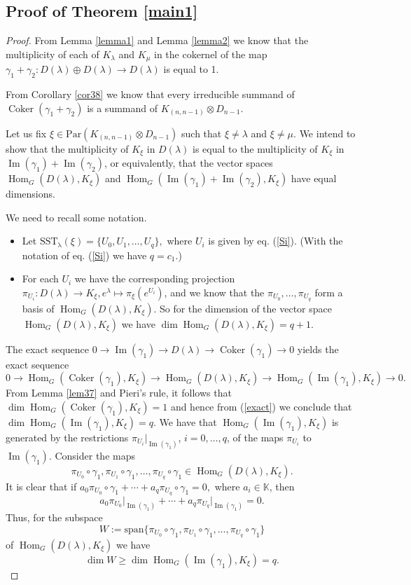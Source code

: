 \documentclass[11pt]{amsart}
\theoremstyle{definition}
\numberwithin{equation}{section}
\DeclareMathOperator{\Ima}{Im}
\DeclareMathOperator{\Hom}{Hom}
\DeclareMathOperator{\coker}{Coker}
\begin{document}
\subsection{ Proof of Theorem \ref{main1}}\label{proofmain}	
\begin{proof}	 From Lemma \ref{lemma1} and Lemma \ref{lemma2} we know that the multiplicity of each of $K_{\lambda}$ and $K_{\mu}$ in the cokernel of the map $\gamma_1 +\gamma_2 : D(\lambda) \oplus D(\lambda) \to D(\lambda)$ is equal to 1. 
	
From Corollary \ref{cor38} we know that every irreducible summand of $\coker(\gamma_1+\gamma_2)$ is a summand of $K_{(n,n-1)} \otimes  D_{n-1}$.

 Let us fix $\xi \in \mathrm{Par}(K_{(n,n-1)} \otimes  D_{n-1})$ such that $\xi \neq \lambda$ and $\xi \neq \mu.$ We intend to show that the multiplicity of $K_\xi$ in $D(\lambda)$ is equal to the multiplicity of  $K_\xi$ in $\Ima(\gamma_1)+\Ima(\gamma_2)$, or equivalently, that the vector spaces $\Hom_G(D(\lambda), K_\xi ) $ and $\Hom_G(\Ima(\gamma_1)+\Ima(\gamma_2), K_\xi ) $ have equal dimensions.
	
	We need to recall some notation. \begin{itemize} \item Let 
	$\mathrm{SST_\lambda}(\xi) = \{ U_0,  U_1, \dots, U_q\},$
	where $U_i$ is given by eq. (\ref{Si}). (With the notation of eq. (\ref{Si}) we have $q=c_1$.) \item For each $U_i$ we have the corresponding projection $\pi_{U_i} : D(\lambda) \to K_\xi, e^\lambda \mapsto \pi_\xi(e^{U_i})$, and we know that the $\pi_{U_0}, \dots, \pi_{U_q}$ form a basis of 
	$\Hom_G(D(\lambda), K_{\xi})$. So for the dimension of the vector space $\Hom_G(D(\lambda), K_{\xi})$ we have $\dim \Hom_G(D(\lambda), K_{\xi}) = q+1$. \end{itemize}
	
	
	The exact sequence $0 \to \Ima(\gamma_1) \to D(\lambda) \to  \coker(\gamma_1) \to 0$ yields the exact sequence \begin{equation}\label{exact}
		0 \to \Hom_G(\coker(\gamma_1), K_\xi) \to \Hom_G(D(\lambda), K_{\xi}) \to \Hom_G(\Ima(\gamma_1), K_\xi)  \to 0.
	\end{equation}
	From Lemma \ref{lem37} and Pieri's rule, it follows that $\dim\Hom_G(\coker(\gamma_1), K_\xi) =1$ and hence from (\ref{exact}) we conclude that $\dim\Hom_G(\Ima(\gamma_1), K_\xi) =q$. We have that $\Hom_G(\Ima(\gamma_1), K_\xi)$ is generated by the restrictions $\pi_{U_i}\big|_{\Ima{(\gamma_1)}}$, $i=0, \dots, q$, of the maps $\pi_{U_i}$ to $\Ima(\gamma_1).$ Consider the maps \[\pi_{U_0} \circ \gamma_1, \pi_{U_1} \circ \gamma_1 , \dots, \pi_{U_q} \circ \gamma_1 \in \Hom_G(D(\lambda), K_\xi).\] It is clear that if $a_0 \pi_{U_0} \circ \gamma_1 + \cdots + a_q \pi_{U_q} \circ \gamma_1 =0,$
	where $a_i \in \mathbb{K}$, then 
	\[a_0 \pi_{U_0}\big|_{\Ima{(\gamma_1)}} + \cdots + a_q \pi_{U_q}\big|_{\Ima{(\gamma_1)}} =0.\]
	Thus, for the subspace \[W:=\mathrm{span}\{\pi_{U_0} \circ \gamma_1, \pi_{U_1} \circ \gamma_1 , \dots, \pi_{U_q} \circ \gamma_1 \} \] 
	of $\Hom_G(D(\lambda), K_\xi ) $ we have 
	\[ \dim W \ge \dim\Hom_G(\Ima(\gamma_1), K_\xi) =q. \]
	

\end{proof}
\end{document}
